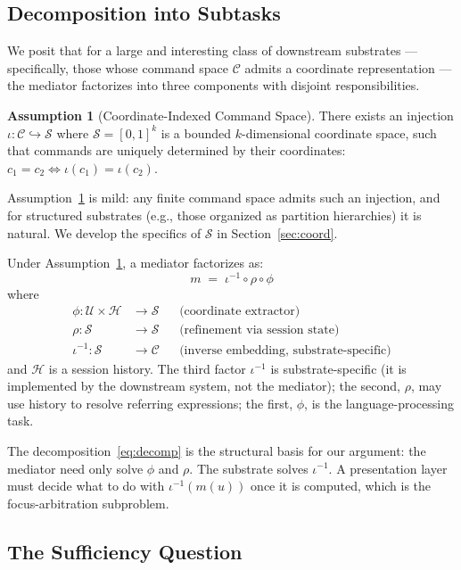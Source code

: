 \documentclass[11pt,a4paper]{article}
\theoremstyle{definition}
\newtheorem{assumption}[theorem]{Assumption}
\theoremstyle{remark}
\newcommand{\Cc}{\mathcal{C}}
\newcommand{\Sc}{\mathcal{S}}
\newcommand{\Uc}{\mathcal{U}}
\begin{document}
\subsection{Decomposition into Subtasks}

We posit that for a large and interesting class of downstream substrates --- specifically, those whose command space $\Cc$ admits a coordinate representation --- the mediator factorizes into three components with disjoint responsibilities.

\begin{assumption}[Coordinate-Indexed Command Space]
\label{assum:coord}
There exists an injection $\iota: \Cc \hookrightarrow \Sc$ where $\Sc = [0,1]^k$ is a bounded $k$-dimensional coordinate space, such that commands are uniquely determined by their coordinates: $c_1 = c_2 \iff \iota(c_1) = \iota(c_2)$.
\end{assumption}

Assumption~\ref{assum:coord} is mild: any finite command space admits such an injection, and for structured substrates (e.g., those organized as partition hierarchies) it is natural. We develop the specifics of $\Sc$ in Section~\ref{sec:coord}.

Under Assumption~\ref{assum:coord}, a mediator factorizes as:
\begin{equation}
\label{eq:decomp}
m \;=\; \iota^{-1} \circ \rho \circ \phi
\end{equation}
where
\begin{align*}
\phi: \Uc \times \mathcal{H} &\to \Sc & &\text{(coordinate extractor)} \\
\rho: \Sc &\to \Sc & &\text{(refinement via session state)} \\
\iota^{-1}: \Sc &\to \Cc & &\text{(inverse embedding, substrate-specific)}
\end{align*}
and $\mathcal{H}$ is a session history. The third factor $\iota^{-1}$ is substrate-specific (it is implemented by the downstream system, not the mediator); the second, $\rho$, may use history to resolve referring expressions; the first, $\phi$, is the language-processing task.

The decomposition~\eqref{eq:decomp} is the structural basis for our argument: the mediator need only solve $\phi$ and $\rho$. The substrate solves $\iota^{-1}$. A presentation layer must decide what to do with $\iota^{-1}(m(u))$ once it is computed, which is the focus-arbitration subproblem.

\subsection{The Sufficiency Question}
\end{document}
